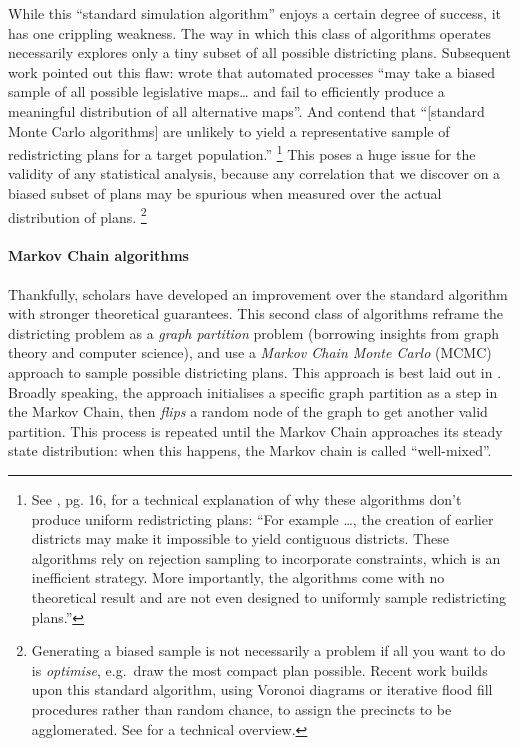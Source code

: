 \documentclass[]{article}
\let\oldparagraph\paragraph
\renewcommand{\paragraph}[1]{\oldparagraph{#1}\mbox{}}
\begin{document}
While this ``standard simulation algorithm'' enjoys a certain degree of
success, it has one crippling weakness. The way in which this class of
algorithms operates necessarily explores only a tiny subset of all
possible districting plans. Subsequent work pointed out this flaw:
\citeauthor{mm2018} wrote that automated processes ``may take a biased
sample of all possible legislative maps\ldots{} and fail to efficiently
produce a meaningful distribution of all alternative maps''. And
\citeauthor{fifieldwp} contend that ``{[}standard Monte Carlo
algorithms{]} are unlikely to yield a representative sample of
redistricting plans for a target population.'' \footnote{See
  \cite{fifieldwp}, pg. 16, for a technical explanation of why these
  algorithms don't produce uniform redistricting plans: ``For example
  \ldots{}, the creation of earlier districts may make it impossible to
  yield contiguous districts. These algorithms rely on rejection
  sampling to incorporate constraints, which is an inefficient strategy.
  More importantly, the algorithms come with no theoretical result and
  are not even designed to uniformly sample redistricting plans.''} This
poses a huge issue for the validity of any statistical analysis, because
any correlation that we discover on a biased subset of plans may be
spurious when measured over the actual distribution of plans. \footnote{Generating
  a biased sample is not necessarily a problem if all you want to do is
  \emph{optimise}, e.g.~draw the most compact plan possible. Recent work
  builds upon this standard algorithm, using Voronoi diagrams or
  iterative flood fill procedures rather than random chance, to assign
  the precincts to be agglomerated. See \cite{lf2019} for a technical
  overview.}

\hypertarget{markov-chain-algorithms}{%
\paragraph{Markov Chain algorithms}\label{markov-chain-algorithms}}

Thankfully, scholars have developed an improvement over the standard
algorithm with stronger theoretical guarantees. This second class of
algorithms reframe the districting problem as a \emph{graph partition}
problem (borrowing insights from graph theory and computer science), and
use a \emph{Markov Chain Monte Carlo} (MCMC) approach to sample possible
districting plans. This approach is best laid out in \cite{fifieldwp}.
Broadly speaking, the approach initialises a specific graph partition as
a step in the Markov Chain, then \emph{flips} a random node of the graph
to get another valid partition. This process is repeated until the
Markov Chain approaches its steady state distribution: when this
happens, the Markov chain is called ``well-mixed''.
\end{document}

